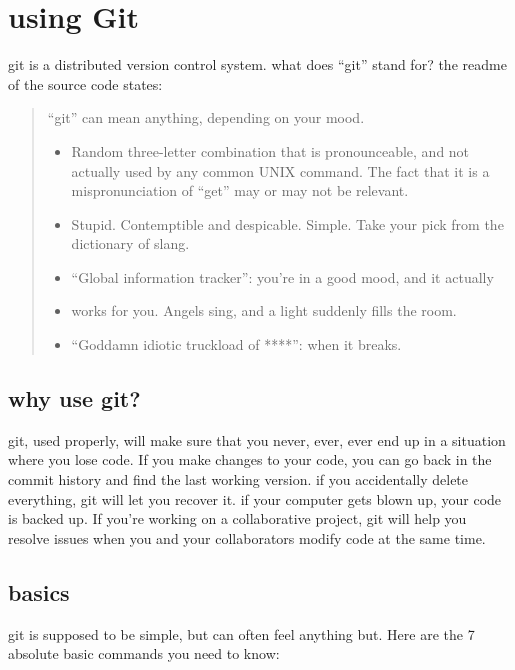 \documentclass[
]{article}
\providecommand{\tightlist}{%
  \setlength{\itemsep}{0pt}\setlength{\parskip}{0pt}}
\begin{document}
\hypertarget{using-git}{%
\section{using Git}\label{using-git}}

git is a distributed version control system. what does ``git'' stand
for? the readme of the source code states:

\begin{quote}
``git'' can mean anything, depending on your mood.

\begin{itemize}
\tightlist
\item
  Random three-letter combination that is pronounceable, and not
  actually used by any common UNIX command. The fact that it is a
  mispronunciation of ``get'' may or may not be relevant.
\item
  Stupid. Contemptible and despicable. Simple. Take your pick from the
  dictionary of slang.
\item
  ``Global information tracker'': you're in a good mood, and it actually
\item
  works for you. Angels sing, and a light suddenly fills the room.
\item
  ``Goddamn idiotic truckload of ****'': when it breaks.
\end{itemize}
\end{quote}

\hypertarget{why-use-git}{%
\subsection{why use git?}\label{why-use-git}}

git, used properly, will make sure that you never, ever, ever end up in
a situation where you lose code. If you make changes to your code, you
can go back in the commit history and find the last working version. if
you accidentally delete everything, git will let you recover it. if your
computer gets blown up, your code is backed up. If you're working on a
collaborative project, git will help you resolve issues when you and
your collaborators modify code at the same time.

\hypertarget{basics}{%
\subsection{basics}\label{basics}}

git is supposed to be simple, but can often feel anything but. Here are
the 7 absolute basic commands you need to know:
\end{document}
